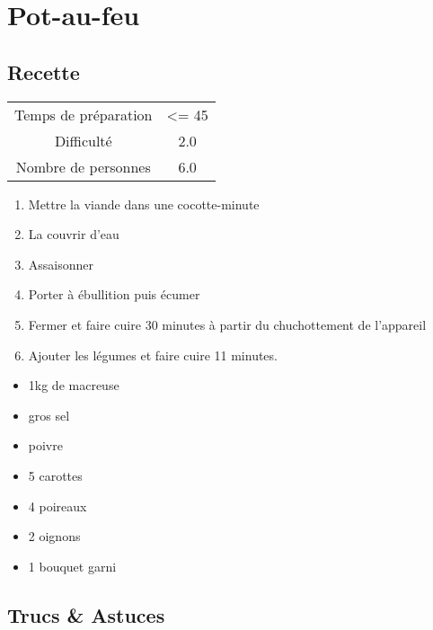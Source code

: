 \newpage
\section{Pot-au-feu}
    \label{sec:Pot-au-feu}
    \subsection{Recette}
    \vspace{1cm}


    \begin{center}
        \begin{tabular}{c|c}
            Temps de préparation & <= 45 \\
            Difficulté & 2.0 \\
            Nombre de personnes & 6.0 
        \end{tabular}
    \end{center}{}

    \vspace{1cm}
    \hline
    \vspace{1cm}

    \begin{minipage}{.7\textwidth}
        \begin{enumerate}
            \item Mettre la viande dans une cocotte-minute
	    \item La couvrir d'eau
	    \item Assaisonner
	    \item Porter à ébullition puis écumer
	    \item Fermer et faire cuire 30 minutes à partir du chuchottement de l'appareil
	    \item Ajouter les légumes et faire cuire 11 minutes.

        \end{enumerate}
    \end{minipage}
    \begin{minipage}{.3\textwidth}
        \begin{flushleft}
        \begin{itemize}
            \item 1kg de macreuse
	    \item gros sel
	    \item poivre
	    \item 5 carottes
	    \item 4 poireaux
	    \item 2 oignons
	    \item 1 bouquet garni

        \end{itemize}
        \end{flushleft}
    \end{minipage}
    
    \vspace{1cm}
    \hline
    \vspace{1cm}
    
    \subsection{Trucs \& Astuces}
        
